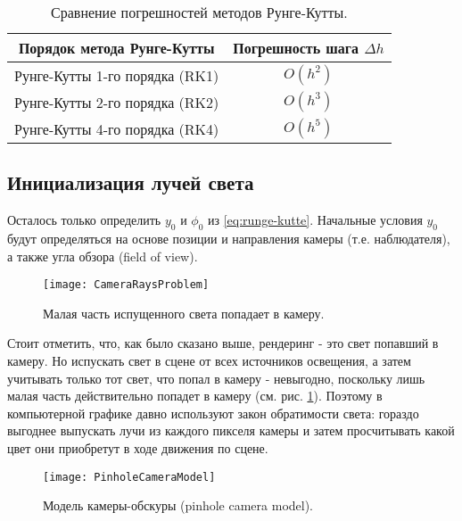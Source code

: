 \begin{center}
    \begin{table}[h!]
        \centering
        \begin{tabular}{|c|c|}
            \hline
            Порядок метода Рунге-Кутты & Погрешность шага $\Delta h$ \\
            \hline
            Рунге-Кутты 1-го порядка (RK1) & $O(h^2)$ \\
            \hline
            Рунге-Кутты 2-го порядка (RK2) & $O(h^3)$ \\
            \hline
            Рунге-Кутты 4-го порядка (RK4) & $O(h^5)$ \\
            \hline
        \end{tabular}
        \caption{Сравнение погрешностей методов Рунге-Кутты.}
        \label{tab:runge-kutte}
    \end{table}
\end{center}


\subsection{Инициализация лучей света}
\label{subsec:ray_init}

Осталось только определить $y_0$ и $\phi_0$ из \eqref{eq:runge-kutte}. Начальные условия $y_0$ будут определяться на основе позиции и направления камеры (т.е. наблюдателя), а также угла обзора (field of view).

\begin{figure}[h]
    \centering
    \texttt{[image: CameraRaysProblem]}
    \caption{Малая часть испущенного света попадает в камеру.}
    \label{fig:camera_rays_problem}
\end{figure}

Стоит отметить, что, как было сказано выше, рендеринг - это свет попавший в камеру. Но испускать свет в сцене от всех источников освещения, а затем учитывать только тот свет, что попал в камеру - невыгодно, поскольку лишь малая часть действительно попадет в камеру (см. рис. \ref{fig:camera_rays_problem}). Поэтому в компьютерной графике давно используют закон обратимости света: гораздо выгоднее выпускать лучи из каждого пикселя камеры и затем просчитывать какой цвет они приобретут в ходе движения по сцене.

\begin{figure}[h]
    \centering
    \texttt{[image: PinholeCameraModel]}
    \caption{Модель камеры-обскуры (pinhole camera model).}
    \label{fig:pinhole_camera}
\end{figure}

